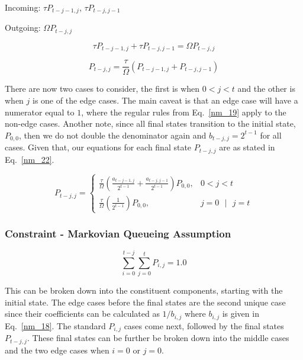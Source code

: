 \documentclass[conference]{IEEEtran}
\begin{document}
Incoming: $\tau P_{t-j-1,j}$, $\tau P_{t-j,j-1}$

Outgoing: $\Omega P_{t-j,j}$

\begin{equation}
  \tau P_{t-j-1,j} + \tau P_{t-j,j-1} = \Omega P_{t-j,j}\label{nm_21}
\end{equation}

\begin{equation}
  P_{t-j,j} = \frac{\tau}{\Omega} (P_{t-j-1,j} + P_{t-j,j-1})\label{nm_21}
\end{equation}

There are now two cases to consider, the first is when $0<j<t$ and the
other is when $j$ is one of the edge cases. The main caveat is that an 
edge case will have a numerator equal to $1$, where the regular rules
from Eq.~\ref{nm_19} apply to the non-edge cases. Another note, since 
all final states transition to the initial state, $P_{0,0}$, then we do not 
double the denominator again and $b_{t-j,j} = 2^{t-1}$ for all cases. Given 
that, our equations for each final state $P_{t-j,j}$ are as stated in Eq.~\ref{nm_22}.

\begin{equation}
  P_{t-j,j} =
    \begin{cases}
      \frac{\tau}{\Omega}\left(\frac{a_{t-j-1,j}}{2^{t-1}} + \frac{a_{t-j,j-1}}{2^{t-1}}\right)P_{0,0}, & 0 < j < t \\
      \frac{\tau}{\Omega}\left(\frac{1}{2^{t-1}}\right)P_{0,0},  & j = 0 \text{ } |\text{ } j = t
    \end{cases}
    \label{nm_22}
\end{equation}

\subsubsection{Constraint - Markovian Queueing Assumption}

\begin{equation}
  \sum_{i=0}^{t-j}{\sum_{j=0}^{t}{P_{i,j}}} = 1.0\label{nm_23}
\end{equation}

This can be broken down into the constituent components, starting with the
initial state. The edge cases before the final states are the second unique case
since their coefficients can be calculated as $1/b_{i,j}$ where $b_{i,j}$ is given in 
Eq.~\ref{nm_18}. The standard $P_{i,j}$ cases come next, followed by the final
states $P_{t-j,j}$. These final states can be further be broken down into the 
middle cases and the two edge cases when $i = 0$ or $j = 0$. 
\end{document}
